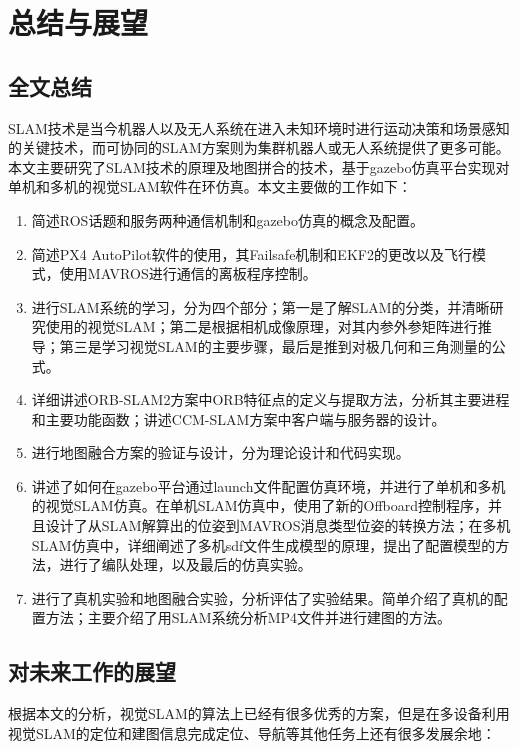 
\renewcommand{\baselinestretch}{1.5}
\fontsize{12pt}{13pt}\selectfont

\chapter{总结与展望} \label{conclusion}


\section{全文总结}

SLAM技术是当今机器人以及无人系统在进入未知环境时进行运动决策和场景感知的关键技术，而可协同的SLAM方案则为集群机器人或无人系统提供了更多可能。本文主要研究了SLAM技术的原理及地图拼合的技术，基于gazebo仿真平台实现对单机和多机的视觉SLAM软件在环仿真。本文主要做的工作如下：

\begin{enumerate}
	\item 简述ROS话题和服务两种通信机制和gazebo仿真的概念及配置。
	\item 简述PX4 AutoPilot软件的使用，其Failsafe机制和EKF2的更改以及飞行模式，使用MAVROS进行通信的离板程序控制。
	\item 进行SLAM系统的学习，分为四个部分；第一是了解SLAM的分类，并清晰研究使用的视觉SLAM；第二是根据相机成像原理，对其内参外参矩阵进行推导；第三是学习视觉SLAM的主要步骤，最后是推到对极几何和三角测量的公式。
	\item 详细讲述ORB-SLAM2方案中ORB特征点的定义与提取方法，分析其主要进程和主要功能函数；讲述CCM-SLAM方案中客户端与服务器的设计。
	\item 进行地图融合方案的验证与设计，分为理论设计和代码实现。
	\item 讲述了如何在gazebo平台通过launch文件配置仿真环境，并进行了单机和多机的视觉SLAM仿真。在单机SLAM仿真中，使用了新的Offboard控制程序，并且设计了从SLAM解算出的位姿到MAVROS消息类型位姿的转换方法；在多机SLAM仿真中，详细阐述了多机sdf文件生成模型的原理，提出了配置模型的方法，进行了编队处理，以及最后的仿真实验。
	\item 进行了真机实验和地图融合实验，分析评估了实验结果。简单介绍了真机的配置方法；主要介绍了用SLAM系统分析MP4文件并进行建图的方法。
\end{enumerate}

\section{对未来工作的展望}

根据本文的分析，视觉SLAM的算法上已经有很多优秀的方案，但是在多设备利用视觉SLAM的定位和建图信息完成定位、导航等其他任务上还有很多发展余地：

